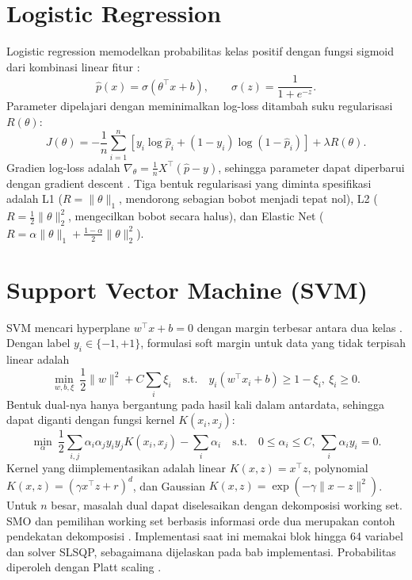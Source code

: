 \section{Logistic Regression}
Logistic regression memodelkan probabilitas kelas positif dengan fungsi sigmoid dari kombinasi linear fitur \cite{ref:lrwhat}:
\begin{equation}
  \hat{p}(x) = \sigma(\theta^\top x + b), \qquad \sigma(z) = \frac{1}{1+e^{-z}}.
\end{equation}
Parameter dipelajari dengan meminimalkan log-loss ditambah suku regularisasi $R(\theta)$:
\begin{equation}
  J(\theta) = -\frac{1}{n}\sum_{i=1}^{n}\left[y_i\log\hat{p}_i + (1-y_i)\log(1-\hat{p}_i)\right] + \lambda R(\theta).
\end{equation}
Gradien log-loss adalah $\nabla_\theta = \frac{1}{n}X^\top(\hat{p}-y)$, sehingga parameter dapat diperbarui dengan gradient descent \cite{ref:lrsga}. Tiga bentuk regularisasi yang diminta spesifikasi adalah L1 ($R=\lVert\theta\rVert_1$, mendorong sebagian bobot menjadi tepat nol), L2 ($R=\frac{1}{2}\lVert\theta\rVert_2^2$, mengecilkan bobot secara halus), dan Elastic Net ($R=\alpha\lVert\theta\rVert_1 + \frac{1-\alpha}{2}\lVert\theta\rVert_2^2$).

\section{Support Vector Machine (SVM)}
SVM mencari hyperplane $w^\top x + b = 0$ dengan margin terbesar antara dua kelas \cite{ref:svmwhat,ref:svmsep}. Dengan label $y_i\in\{-1,+1\}$, formulasi soft margin untuk data yang tidak terpisah linear \cite{ref:svmnonsep} adalah
\begin{equation}
  \min_{w,b,\xi}\ \frac{1}{2}\lVert w\rVert^2 + C\sum_i \xi_i \quad \text{s.t.}\quad y_i(w^\top x_i + b)\ge 1-\xi_i,\ \xi_i\ge 0.
\end{equation}
Bentuk dual-nya hanya bergantung pada hasil kali dalam antardata, sehingga dapat diganti dengan fungsi kernel $K(x_i,x_j)$:
\begin{equation}
  \min_\alpha\ \frac{1}{2}\sum_{i,j}\alpha_i\alpha_j y_i y_j K(x_i,x_j) - \sum_i\alpha_i \quad \text{s.t.}\quad 0\le\alpha_i\le C,\ \sum_i\alpha_i y_i = 0.
\end{equation}
Kernel yang diimplementasikan adalah linear $K(x,z)=x^\top z$, polynomial $K(x,z)=(\gamma x^\top z + r)^d$, dan Gaussian $K(x,z)=\exp(-\gamma\lVert x-z\rVert^2)$. Untuk $n$ besar, masalah dual dapat diselesaikan dengan dekomposisi working set. SMO dan pemilihan working set berbasis informasi orde dua merupakan contoh pendekatan dekomposisi \cite{ref:platt_smo,ref:fan}. Implementasi saat ini memakai blok hingga 64 variabel dan solver SLSQP, sebagaimana dijelaskan pada bab implementasi. Probabilitas diperoleh dengan Platt scaling \cite{ref:platt_prob}.

